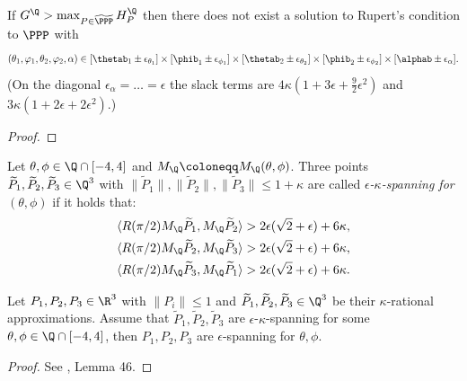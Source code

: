 \begin{theorem}
\begin{align*}
    \end{align*}
    If $G^{\Q}>\max_{P\in \widetilde{\PPP}} H^{\Q}_P$ then there does not exist a solution to Rupert's condition to $\PPP$ with
    \[
    (\theta_1,\varphi_1,\theta_2,\varphi_2,\alpha) \in [\thetab_1\pm\epsilon_{\theta_1}]\times[\phib_1\pm\epsilon_{\phi_1}]\times[\thetab_2\pm\epsilon_{\theta_2}]\times[\phib_2\pm\epsilon_{\phi_2}]\times[\alphab\pm\epsilon_\alpha].
    \]
    (On the diagonal $\epsilon_\alpha = \dots = \epsilon$ the slack terms are
    $4\kappa(1+3\epsilon+\tfrac92\epsilon^2)$ and
    $3\kappa(1+2\epsilon+2\epsilon^2)$.)
\end{theorem}

\begin{proof}
\leanok
{}
\end{proof}


\begin{definition} \label{def:ekspanning}
\leanok
{}
    Let $\theta, \phi \in \Q \cap [-4,4]$ and $M_{\Q} \coloneqq M_{\Q}(\theta, \phi)$. Three points $\widetilde{P}_1, \widetilde{P}_2, \widetilde{P}_3 \in \Q^3$ with $\|\widetilde{P}_1\|, \|\widetilde{P}_2\|, \|\widetilde{P}_3\| \leq 1+\kappa$ are called \emph{$\epsilon$-$\kappa$-spanning for $(\theta, \phi)$} if it holds that:
\begin{align*}
    \langle R(\pi/2) M_{\Q} \widetilde{P}_1,M_{\Q} \widetilde{P}_{2}\rangle > 2 \epsilon(\sqrt{2} + \epsilon) + 6\kappa,\\
    \langle R(\pi/2) M_{\Q} \widetilde{P}_2,M_{\Q} \widetilde{P}_{3}\rangle > 2 \epsilon(\sqrt{2} + \epsilon) + 6\kappa,\\
    \langle R(\pi/2) M_{\Q} \widetilde{P}_3,M_{\Q} \widetilde{P}_{1}\rangle > 2 \epsilon(\sqrt{2} + \epsilon) + 6\kappa.
\end{align*}
\end{definition}


\begin{lemma} \label{lem:ekspanningespanning}
\leanok
{}
    Let $P_1, P_2, P_3 \in \R^3$ with $\|P_i\| \leq 1$ and $\widetilde{P}_1, \widetilde{P}_2, \widetilde{P}_3 \in \Q^3$ be their $\kappa$-rational approximations. Assume that $\widetilde{P}_1, \widetilde{P}_2, \widetilde{P}_3$ are $\epsilon$-$\kappa$-spanning for some $\theta, \phi \in \Q \cap [-4,4]$, then $P_1, P_2, P_3$ are $\epsilon$-spanning for $\theta, \phi$.
\end{lemma}
\begin{proof}
\leanok
{}
See \cite{polyhedron.without.rupert}, Lemma 46.
\end{proof}



